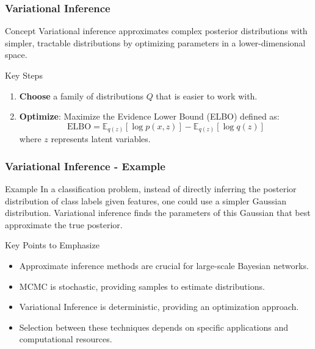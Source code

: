 \documentclass[aspectratio=169]{beamer}
\begin{document}
\begin{frame}[fragile]
    \frametitle{Variational Inference}
    
    \begin{block}{Concept}
        Variational inference approximates complex posterior distributions with simpler, tractable distributions by optimizing parameters in a lower-dimensional space.
    \end{block}
    
    \begin{block}{Key Steps}
        \begin{enumerate}
            \item \textbf{Choose} a family of distributions \( Q \) that is easier to work with.
            \item \textbf{Optimize}: Maximize the Evidence Lower Bound (ELBO) defined as:
            \begin{equation}
                \text{ELBO} = \mathbb{E}_{q(z)}[\log p(x, z)] - \mathbb{E}_{q(z)}[\log q(z)]
            \end{equation}
            where \( z \) represents latent variables.
        \end{enumerate}
    \end{block}
\end{frame}

\begin{frame}[fragile]
    \frametitle{Variational Inference - Example}
    
    \begin{block}{Example}
        In a classification problem, instead of directly inferring the posterior distribution of class labels given features, one could use a simpler Gaussian distribution. Variational inference finds the parameters of this Gaussian that best approximate the true posterior.
    \end{block}
    
    \begin{block}{Key Points to Emphasize}
        \begin{itemize}
            \item Approximate inference methods are crucial for large-scale Bayesian networks.
            \item MCMC is stochastic, providing samples to estimate distributions.
            \item Variational Inference is deterministic, providing an optimization approach.
            \item Selection between these techniques depends on specific applications and computational resources.
        \end{itemize}
    \end{block}
\end{frame}
\end{document}

